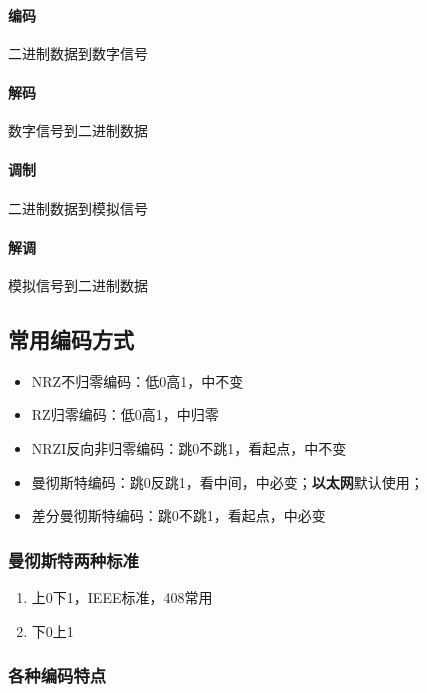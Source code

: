 \paragraph{编码}
二进制数据到数字信号

\paragraph{解码}
数字信号到二进制数据

\paragraph{调制}
二进制数据到模拟信号

\paragraph{解调}
模拟信号到二进制数据


\subsection{常用编码方式}
\begin{itemize}
    \item NRZ不归零编码：低0高1，中不变
    \item RZ归零编码：低0高1，中归零
    \item NRZI反向非归零编码：跳0不跳1，看起点，中不变
    \item 曼彻斯特编码：跳0反跳1，看中间，中必变；\textbf{以太网}默认使用；
    \item 差分曼彻斯特编码：跳0不跳1，看起点，中必变
\end{itemize}

\subsubsection{曼彻斯特两种标准}
\begin{enumerate}
    \item 上0下1，IEEE标准，408常用
    \item 下0上1
\end{enumerate}


\subsubsection{各种编码特点}


